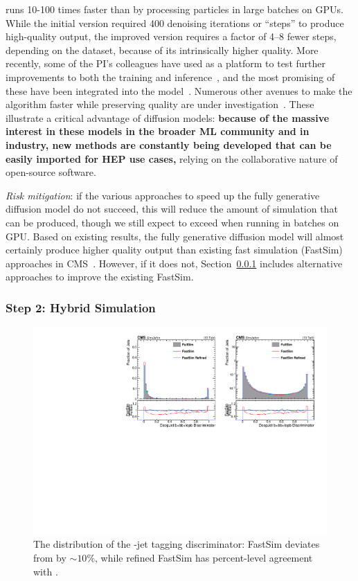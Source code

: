 \diffu runs 10-100 times faster than \GEANTfour by processing particles in large batches on GPUs.
While the initial version required 400 denoising iterations or ``steps'' to produce high-quality output,
the improved version requires a factor of 4--8 fewer steps, depending on the dataset, because of its intrinsically higher quality.
More recently, some of the PI's colleagues have used \diffu as a platform to test further improvements to both the training and inference~\cite{Jiang:2024ohg},
and the most promising of these have been integrated into the model~\cite{Amram:GitHub}.
Numerous other avenues to make the algorithm faster while preserving quality are under investigation~\cite{Rombach:2022,Song:2023,Mei:2023}.
These illustrate a critical advantage of diffusion models:
\textbf{because of the massive interest in these models in the broader ML community and in industry,
new methods are constantly being developed that can be easily imported for HEP use cases,}
relying on the collaborative nature of open-source software.

\textit{Risk mitigation}: if the various approaches to speed up the fully generative diffusion model do not succeed,
this will reduce the amount of simulation that can be produced,
though we still expect to exceed \GEANTfour when running in batches on GPU.
Based on existing results, the fully generative diffusion model will almost certainly produce higher quality output than existing fast simulation (FastSim) approaches in CMS~\cite{Sekmen:2016iql}.
However, if it does not, Section~\ref{subsec:refine} includes alternative approaches to improve the existing FastSim.

\subsubsection{Step 2: Hybrid Simulation}\label{subsec:refine}

\begin{figure}
\centering
\includegraphics[width=0.46\myfigurewidth]{figures/regression_1D_20221127_DeepFlavB.pdf}
\caption{The distribution of the \DEEPJET \cPqb-jet tagging discriminator: FastSim deviates from \GEANTfour by ${\sim}10\%$, while refined FastSim has percent-level agreement with \GEANTfour.}
\label{fig:refine}
\end{figure}

